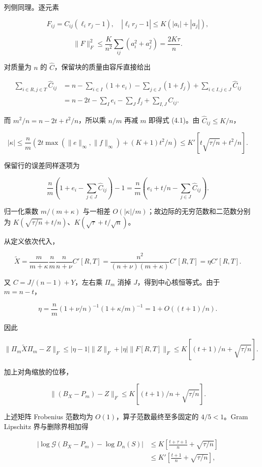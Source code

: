 \documentclass[11pt,a4paper]{article}
\begin{document}
列侧同理。逐元素

\[
F_{ij}=C_{ij}(\ell_ir_j-1),\quad
|\ell_ir_j-1|\le K(|a_i|+|a_j|),
\]

\[
\|F\|_F^2\le\frac K{n^2}\sum_{ij}(a_i^2+a_j^2)
=\frac{2K\tau}n.
\]

对质量为 \(n\) 的 \(\widehat C\)，保留块的质量由容斥直接给出

\[
\begin{aligned}
\sum_{i\in R,j\in T}\widehat C_{ij}
&=n-\sum_{i\in I}(1+e_i)-\sum_{j\in J}(1+f_j)
+\sum_{i\in I,j\in J}\widehat C_{ij}\\
&=n-2t-\sum_Ie_i-\sum_Jf_j+\sum_{I,J}\widehat C_{ij}.
\end{aligned}
\]

而 \(m^2/n=n-2t+t^2/n\)，所以乘 \(n/m\) 再减 \(m\) 即得式 (4.1)。由 \(\widehat C_{ij}\le K/n\)，

\[
|\kappa|\le\frac nm\left(2t\max(\|e\|_\infty,\|f\|_\infty)
+(K+1)t^2/n\right)
\le K'[t\sqrt{\tau/n}+t^2/n].
\]

保留行的误差同样逐项为

\[
\frac nm\left(1+e_i-\sum_{j\in J}\widehat C_{ij}\right)-1
=\frac nm\left(e_i+t/n-\sum_{j\in J}\widehat C_{ij}\right).
\]

归一化乘数 \(m/(m+\kappa)\) 与一相差 \(O(|\kappa|/m)\)；故边际的无穷范数和二范数分别为 \(K(\sqrt{\tau/n}+t/n)\)、\(K(\sqrt\tau+t/\sqrt n)\)。

从定义依次代入，

\[
\widetilde X=\frac m{m+\kappa}\frac nm\frac n{n+\nu}C'[R,T]
=\frac{n^2}{(n+\nu)(m+\kappa)}C'[R,T]=\eta C'[R,T].
\]

又 \(C=J/(n-1)+Y\)，左右乘 \(\Pi_m\) 消掉 \(J\)，得到中心核恒等式。由于 \(m=n-t\)，

\[
\eta=\frac nm(1+\nu/n)^{-1}(1+\kappa/m)^{-1}
=1+O((t+1)/n).
\]

因此

\[
\|\Pi_m\widetilde X\Pi_m-Z\|_F
\le|\eta-1|\|Z\|_F+|\eta|\|F[R,T]\|_F
\le K[(t+1)/n+\sqrt{\tau/n}].
\]

加上对角缩放的位移，

\[
\|(B_X-P_m)-Z\|_F
\le K[(t+1)/n+\sqrt{\tau/n}].
\]

上述矩阵 Frobenius 范数均为 \(O(1)\)，算子范数最终至多固定的 \(4/5<1\)。Gram Lipschitz 界与删除界相加得

\[
\begin{aligned}
|\log\mathcal G(B_X-P_m)-\log D_n(S)|
&\le K\left[\frac{t+\tau+1}n+\sqrt{\tau/n}\right]\\
&\le K'\left[\frac{t+1}n+\sqrt{\tau/n}\right],
\end{aligned}
\]
\end{document}
